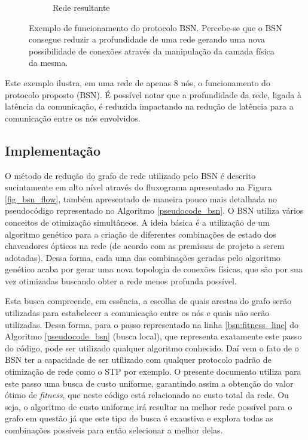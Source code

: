 \begin{figure}[t!]
\begin{subfigure}[t]{0.4\textwidth}
	\caption{Rede resultante}
	\label{BSN-example-rede-otimizada}
	\end{subfigure}
	\caption[Exemplo de funcionamento do BSN]{Exemplo de funcionamento do protocolo BSN. Percebe-se que o BSN consegue reduzir a profundidade de uma rede gerando uma nova possibilidade de conexões através da manipulação da camada física da mesma.}
	\label{fig-bsn-exemplo}
\end{figure}

Este exemplo ilustra, em uma rede de apenas 8 nós, o funcionamento do protocolo proposto (BSN). É possível notar que a profundidade da rede, ligada à latência da comunicação, é reduzida impactando na redução de latência para a comunicação entre os nós envolvidos.

\subsection{Implementação}
\label{implementacao}
O método de redução do grafo de rede utilizado pelo BSN é descrito sucintamente em alto nível através do fluxograma apresentado na Figura \ref{fig_bsn_flow}, também apresentado de maneira pouco mais detalhada no pseudocódigo representado no Algoritmo \ref{pseudocode_bsn}. O BSN utiliza vários conceitos de otimização simultâneos. A ideia básica é a utilização de um algoritmo genético para a criação de diferentes combinações de estado dos chaveadores ópticos na rede (de acordo com as premissas de projeto a serem adotadas). Dessa forma, cada uma das combinações geradas pelo algoritmo genético acaba por gerar uma nova topologia de conexões físicas, que são por sua vez otimizadas buscando obter a rede menos profunda possível. 

Esta busca compreende, em essência, a escolha de quais arestas do grafo serão utilizadas para estabelecer a comunicação entre os nós e quais não serão utilizadas. Dessa forma, para o passo representado na linha \ref{bsn:fitness_line} do Algoritmo \ref{pseudocode_bsn} (busca local), que representa exatamente este passo do código, pode ser utilizado qualquer algoritmo conhecido. Daí vem o fato de o BSN ter a capacidade de ser utilizado com qualquer protocolo padrão de otimização de rede como o STP por exemplo. O presente documento utiliza para este passo uma busca de custo uniforme, garantindo assim a obtenção do valor ótimo de \emph{fitness}, que neste código está relacionado ao custo total da rede. Ou seja, o algoritmo de custo uniforme irá resultar na melhor rede possível para o grafo em questão já que este tipo de busca é exaustiva e explora todas as combinações possíveis para então selecionar a melhor delas.

